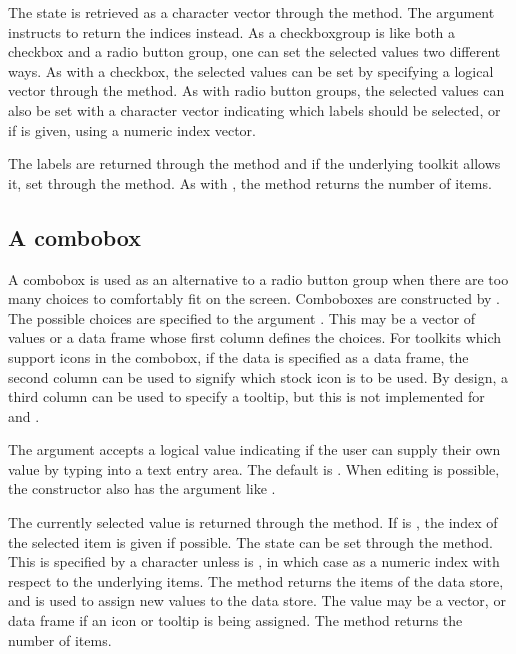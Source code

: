 The state is retrieved as a character vector through the
 method. The  argument
instructs  to return the indices instead. As a
checkboxgroup is like both a checkbox and a radio button group, one
can set the selected values two different ways. As with a checkbox, 
the selected values can be set by specifying a logical vector through the
 method. As with radio button groups,
the selected values can also be set with a character vector indicating
which labels should be selected, or if  is given,
using a numeric index vector.

The labels are returned through the \method{[}{gcheckboxgroup} method
and if the underlying toolkit allows it, set through the
\method{[\ASSIGN}{gcheckboxgroup} method. As with ,
the  method returns the number of items.

\subsection{A combobox}
\label{sec:gWidgets-combobox}

A combobox is used as an alternative to a radio button group when
there are too many choices to comfortably fit on the screen. Comboboxes are
constructed by . The possible choices are specified to the argument
. This may be a vector of values or a data
frame whose first column defines the choices. For toolkits which
support icons in the combobox, if the data is specified as a data
frame, the second column can be used to signify which stock icon is to
be used. By design, a third column can be used to specify a tooltip,
but this is not implemented for  and . 

The argument  accepts a logical value
indicating if the user can supply their own value by typing into a
text entry area. The default is . When editing is possible, the constructor also
has the  argument like
.

The currently selected value is returned through the
 method. If  is , the
index of the selected item is given if possible. The state can be set
through the  method. This is
specified by a character unless  is , in which
case as a numeric index with respect to the underlying items. The
\method{[}{gcombobox} method returns the items of the data store, and
\method{[\ASSIGN}{gcombobox} is used to assign new values to the data
store. The value may be a vector, or data frame if an icon or tooltip
is being assigned. The  method returns the
number of items.

